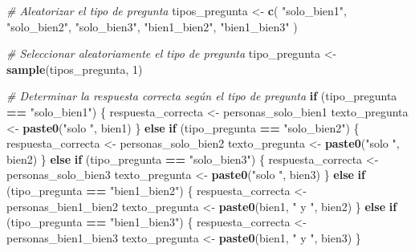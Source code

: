 \documentclass[
]{article}
\newenvironment{Shaded}{\begin{snugshade}}{\end{snugshade}}
\newcommand{\CommentTok}[1]{\textcolor[rgb]{0.56,0.35,0.01}{\textit{#1}}}
\newcommand{\ControlFlowTok}[1]{\textcolor[rgb]{0.13,0.29,0.53}{\textbf{#1}}}
\newcommand{\DecValTok}[1]{\textcolor[rgb]{0.00,0.00,0.81}{#1}}
\newcommand{\FunctionTok}[1]{\textcolor[rgb]{0.13,0.29,0.53}{\textbf{#1}}}
\newcommand{\NormalTok}[1]{#1}
\newcommand{\OtherTok}[1]{\textcolor[rgb]{0.56,0.35,0.01}{#1}}
\newcommand{\SpecialCharTok}[1]{\textcolor[rgb]{0.81,0.36,0.00}{\textbf{#1}}}
\newcommand{\StringTok}[1]{\textcolor[rgb]{0.31,0.60,0.02}{#1}}
\begin{document}
\begin{Shaded}
\begin{Highlighting}[]
\CommentTok{\# Aleatorizar el tipo de pregunta}
\NormalTok{tipos\_pregunta }\OtherTok{\textless{}{-}} \FunctionTok{c}\NormalTok{(}
  \StringTok{"solo\_bien1"}\NormalTok{,}
  \StringTok{"solo\_bien2"}\NormalTok{,}
  \StringTok{"solo\_bien3"}\NormalTok{,}
  \StringTok{"bien1\_bien2"}\NormalTok{,}
  \StringTok{"bien1\_bien3"}
\NormalTok{)}

\CommentTok{\# Seleccionar aleatoriamente el tipo de pregunta}
\NormalTok{tipo\_pregunta }\OtherTok{\textless{}{-}} \FunctionTok{sample}\NormalTok{(tipos\_pregunta, }\DecValTok{1}\NormalTok{)}

\CommentTok{\# Determinar la respuesta correcta según el tipo de pregunta}
\ControlFlowTok{if}\NormalTok{ (tipo\_pregunta }\SpecialCharTok{==} \StringTok{"solo\_bien1"}\NormalTok{) \{}
\NormalTok{  respuesta\_correcta }\OtherTok{\textless{}{-}}\NormalTok{ personas\_solo\_bien1}
\NormalTok{  texto\_pregunta }\OtherTok{\textless{}{-}} \FunctionTok{paste0}\NormalTok{(}\StringTok{"solo "}\NormalTok{, bien1)}
\NormalTok{\} }\ControlFlowTok{else} \ControlFlowTok{if}\NormalTok{ (tipo\_pregunta }\SpecialCharTok{==} \StringTok{"solo\_bien2"}\NormalTok{) \{}
\NormalTok{  respuesta\_correcta }\OtherTok{\textless{}{-}}\NormalTok{ personas\_solo\_bien2}
\NormalTok{  texto\_pregunta }\OtherTok{\textless{}{-}} \FunctionTok{paste0}\NormalTok{(}\StringTok{"solo "}\NormalTok{, bien2)}
\NormalTok{\} }\ControlFlowTok{else} \ControlFlowTok{if}\NormalTok{ (tipo\_pregunta }\SpecialCharTok{==} \StringTok{"solo\_bien3"}\NormalTok{) \{}
\NormalTok{  respuesta\_correcta }\OtherTok{\textless{}{-}}\NormalTok{ personas\_solo\_bien3}
\NormalTok{  texto\_pregunta }\OtherTok{\textless{}{-}} \FunctionTok{paste0}\NormalTok{(}\StringTok{"solo "}\NormalTok{, bien3)}
\NormalTok{\} }\ControlFlowTok{else} \ControlFlowTok{if}\NormalTok{ (tipo\_pregunta }\SpecialCharTok{==} \StringTok{"bien1\_bien2"}\NormalTok{) \{}
\NormalTok{  respuesta\_correcta }\OtherTok{\textless{}{-}}\NormalTok{ personas\_bien1\_bien2}
\NormalTok{  texto\_pregunta }\OtherTok{\textless{}{-}} \FunctionTok{paste0}\NormalTok{(bien1, }\StringTok{" y "}\NormalTok{, bien2)}
\NormalTok{\} }\ControlFlowTok{else} \ControlFlowTok{if}\NormalTok{ (tipo\_pregunta }\SpecialCharTok{==} \StringTok{"bien1\_bien3"}\NormalTok{) \{}
\NormalTok{  respuesta\_correcta }\OtherTok{\textless{}{-}}\NormalTok{ personas\_bien1\_bien3}
\NormalTok{  texto\_pregunta }\OtherTok{\textless{}{-}} \FunctionTok{paste0}\NormalTok{(bien1, }\StringTok{" y "}\NormalTok{, bien3)}
\NormalTok{\}}


\end{Highlighting}
\end{Shaded}
\end{document}

